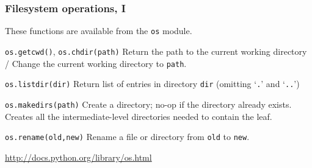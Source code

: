 \documentclass[english,serif,mathserif,xcolor=pdftex,dvipsnames,table]{beamer}
\begin{document}
\begin{frame}[fragile]
  \frametitle{Filesystem operations, I}
  \small
  These functions are available from the \texttt{os} module.

  \begin{describe}{\lstinline|os.getcwd()|, \lstinline|os.chdir(path)|}
    Return the path to the current working directory /
    Change the current working directory to \texttt{path}.
  \end{describe}

  \begin{describe}{\lstinline|os.listdir(dir)|}
    Return list of entries in directory \texttt{dir} (omitting
    `\texttt{.}' and `\texttt{..}')
  \end{describe}


  \begin{describe}{\lstinline|os.makedirs(path)|}
    Create a directory; no-op if the directory already exists.
    Creates all the intermediate-level directories needed to contain
    the leaf.
  \end{describe}

  \begin{describe}{\lstinline|os.rename(old,new)|}
    Rename a file or directory from \texttt{old} to \texttt{new}.
  \end{describe}

  \begin{references}
    \url{http://docs.python.org/library/os.html}
  \end{references}
\end{frame}
\end{document}
